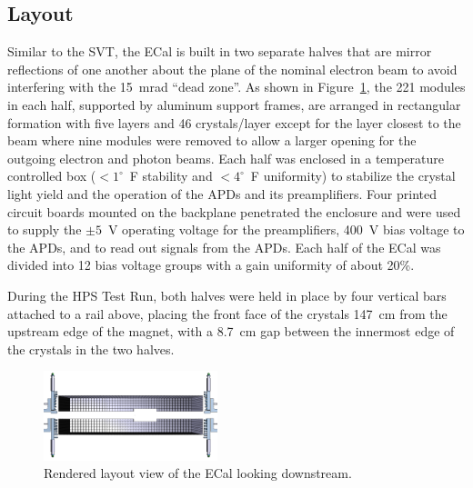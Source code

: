 \documentclass[final,3p,times,twocolumn]{elsarticle}
\begin{document}
\subsection{Layout}
Similar to the SVT, the ECal is built in two separate halves that are mirror reflections of one another 
about the plane of the nominal electron beam to avoid interfering with the 15~mrad ``dead zone''. 
As shown in Figure~\ref{fig:ecal}, the 221 modules in each half, supported by aluminum support frames, 
are arranged in rectangular formation with five layers and 46 crystals/layer except for the layer closest to 
the beam where nine modules were removed to allow a larger opening for the outgoing electron and 
photon beams. Each half was enclosed in a temperature controlled box ($<1^{\circ}$~F stability and 
$<4^{\circ}$~F uniformity) to stabilize the crystal light yield and the operation of the APDs and its 
preamplifiers. 
Four printed circuit boards mounted on the backplane penetrated the enclosure and were used to 
supply the $\pm 5$~V operating voltage for the preamplifiers, 400~V bias voltage to the APDs, and to 
read out signals from the APDs. Each half of the ECal was divided into 12 bias voltage groups with a 
gain uniformity of about 20\%. 

During the HPS Test Run, both halves were held in place by four vertical bars attached to a rail above, 
placing the front face of the crystals 147~cm from the upstream edge of the magnet, with a 
8.7~cm gap between the innermost edge of the crystals in the two halves.
\begin{figure}[]
\begin{center}
\includegraphics[width=0.45\textwidth]{ECal}
\caption{\small Rendered layout view of the ECal looking downstream.
\label{fig:ecal}}
\end{center}
\end{figure}
\end{document}
